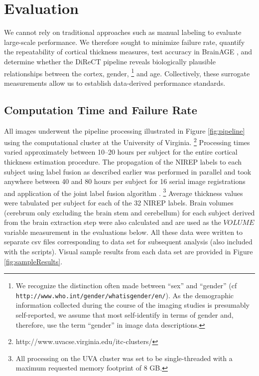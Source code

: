 \section{Evaluation}
We cannot rely on traditional approaches such as manual
labeling to evaluate large-scale performance.  We therefore sought to
minimize failure rate, quantify the repeatability of cortical
thickness measures, test accuracy in BrainAGE \citep{franke2010}, and
determine whether the DiReCT pipeline reveals biologically plausible relationships
between the cortex, gender,%
\footnote{
We recognize the distinction often made between ``sex'' and ``gender'' 
(cf {\tt http://www.who.int/gender/whatisgender/en/}).
As the demographic information collected during the course of the imaging studies 
is presumably self-reported, we assume that most self-identify in terms of 
gender and, therefore, use the term ``gender'' in image data
descriptions.
}
and age.  Collectively, these surrogate
measurements allow us to establish data-derived performance standards.

\subsection{Computation Time and Failure Rate}
All images underwent the pipeline processing illustrated in Figure 
\ref{fig:pipeline} using the computational cluster at the University 
of Virginia.%
\footnote{
http://www.uvacse.virginia.edu/itc-clusters/
}  
Processing times varied approximately between 10--20 hours per subject
for the entire cortical thickness estimation procedure.  The propagation of the
NIREP labels to each subject using label fusion as described earlier
was performed in parallel and took anywhere between 40 and 80 hours per 
subject for 16 serial image registrations and application of the joint label fusion algorithm \citep{wang2013}.%
\footnote{
All processing on the UVA cluster was set to be single-threaded with a maximum requested memory footprint of 8 GB.  
}  
Average thickness values were tabulated per subject for each of the
32 NIREP labels.  Brain volumes (cerebrum only excluding the brain stem and
cerebellum) for each subject derived from the brain 
extraction step were also calculated and are used as the $VOLUME$ 
variable measurement in the evaluations below.  
All these data were written to separate csv
files corresponding to data set for subsequent 
analysis (also included with the scripts).  Visual sample results from each data set are provided in 
Figure \ref{fig:sampleResults}.

